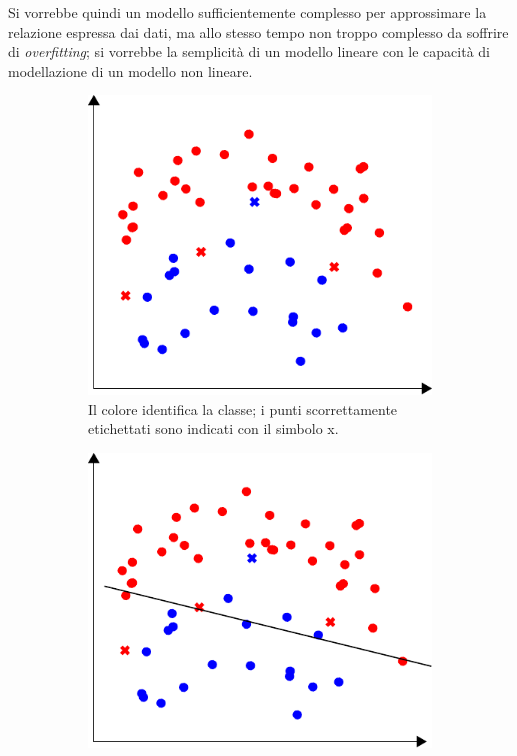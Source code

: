 Si vorrebbe quindi un modello sufficientemente complesso per approssimare la relazione espressa dai dati, ma allo stesso tempo non troppo complesso da soffrire di \emph{overfitting}; si vorrebbe la semplicità di un modello lineare con le capacità di modellazione di un modello non lineare. 
\begin{figure}
    \begin{subfigure}[t]{.45\textwidth}
        \centering
        \includegraphics[width=\textwidth]{img/under_over_fitting_1.pdf}
        \caption{Il colore identifica la classe; i punti scorrettamente etichettati sono indicati con il simbolo x.}
    \end{subfigure}%
    \hfill
    \begin{subfigure}[t]{.45\textwidth}
        \centering
        \includegraphics[width=\textwidth]{img/under_over_fitting_2.pdf}

\end{subfigure}
\end{figure}
